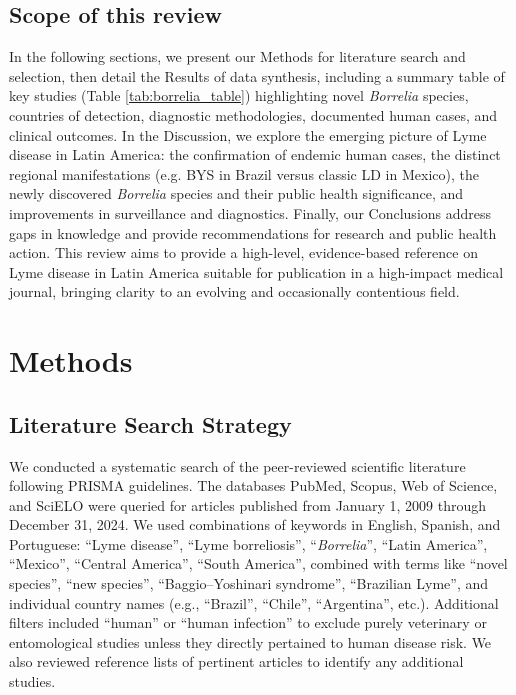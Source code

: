 \documentclass[11pt,letterpaper]{article}
\begin{document}
\subsection{Scope of this review}
In the following sections, we present our Methods for literature search and selection, then detail the Results of data synthesis, including a summary table of key studies (Table \ref{tab:borrelia_table}) highlighting novel \textit{Borrelia} species, countries of detection, diagnostic methodologies, documented human cases, and clinical outcomes. In the Discussion, we explore the emerging picture of Lyme disease in Latin America: the confirmation of endemic human cases, the distinct regional manifestations (e.g. BYS in Brazil versus classic LD in Mexico), the newly discovered \textit{Borrelia} species and their public health significance, and improvements in surveillance and diagnostics. Finally, our Conclusions address gaps in knowledge and provide recommendations for research and public health action. This review aims to provide a high-level, evidence-based reference on Lyme disease in Latin America suitable for publication in a high-impact medical journal, bringing clarity to an evolving and occasionally contentious field.

\section{Methods}
\subsection{Literature Search Strategy}
We conducted a systematic search of the peer-reviewed scientific literature following PRISMA guidelines. The databases PubMed, Scopus, Web of Science, and SciELO were queried for articles published from January 1, 2009 through December 31, 2024. We used combinations of keywords in English, Spanish, and Portuguese: “Lyme disease”, “Lyme borreliosis”, “\textit{Borrelia}”, “Latin America”, “Mexico”, “Central America”, “South America”, combined with terms like “novel species”, “new species”, “Baggio–Yoshinari syndrome”, “Brazilian Lyme”, and individual country names (e.g., “Brazil”, “Chile”, “Argentina”, etc.). Additional filters included “human” or “human infection” to exclude purely veterinary or entomological studies unless they directly pertained to human disease risk. We also reviewed reference lists of pertinent articles to identify any additional studies.
\end{document}
